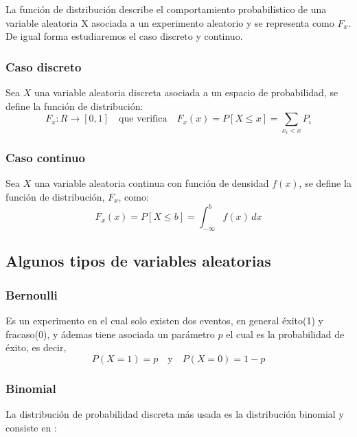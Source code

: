 \documentclass[
  12pt,
]{krantz}
\theoremstyle{definition}
\theoremstyle{definition}
\theoremstyle{definition}
\theoremstyle{remark}
\begin{document}
La función de distribución describe el comportamiento probabilístico de una variable aleatoria X asociada a un experimento aleatorio y se representa como \(F_x\). De igual forma estudiaremos el caso discreto y continuo.

\hypertarget{caso-discreto}{%
\subsubsection{Caso discreto}\label{caso-discreto}}

Sea \(X\) una variable aleatoria discreta asociada a un espacio de probabilidad, se define la función de distribución: \[F_x:R\rightarrow [0,1] \quad \textrm{que verifica} \quad F_x(x)=P[X\leq x]=\sum_{x_i<x} P_i\]

\hypertarget{caso-continuo}{%
\subsubsection{Caso continuo}\label{caso-continuo}}

Sea \(X\) una variable aleatoria continua con función de densidad \(f(x)\), se define la función de distribución, \(F_x\), como:\[F_x(x)=P[X \leq b ] = \int_{-\infty}^{b}  \! f(x) \, dx\]

\hypertarget{algunos-tipos-de-variables-aleatorias}{%
\subsection{Algunos tipos de variables aleatorias}\label{algunos-tipos-de-variables-aleatorias}}

\hypertarget{bernoulli}{%
\subsubsection{Bernoulli}\label{bernoulli}}

Es un experimento en el cual solo existen dos eventos, en general éxito(1) y fracaso(0), y ádemas tiene asociada un parámetro \(p\) el cual es la probabilidad de éxito, es decir, \[P(X=1)=p \quad \textrm{y} \quad P(X=0)=1-p\]

\hypertarget{binomial}{%
\subsubsection{Binomial}\label{binomial}}

La distribución de probabilidad discreta más usada es la distribución binomial y consiste en :
\end{document}
